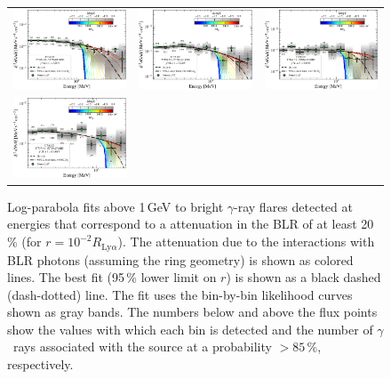 \documentclass[twocolumn]{aastex62}
\newcommand{\Grays}{$\gamma$~rays\xspace}
\newcommand{\gray}{$\gamma$-ray\xspace}
\begin{document}
\begin{figure}
\begin{tabular}{ccc}
    \includegraphics[width=0.32\linewidth]{figures/sed_CTA102_t002_LogParabola_3min_ring_emin1000.pdf} & 
    \includegraphics[width=0.32\linewidth]{figures/sed_CTA102_t003_LogParabola_3min_ring_emin1000.pdf} & 
    \includegraphics[width=0.32\linewidth]{figures/sed_CTA102_t004_LogParabola_3min_ring_emin1000.pdf}\\
    \includegraphics[width=0.32\linewidth]{figures/sed_CTA102_t001_LogParabola_3min_ring_emin1000.pdf}
    \end{tabular}

    \caption{Log-parabola fits above 1\,GeV to bright \gray flares detected at energies that correspond to a attenuation in the BLR of at least 20\,\% (for $r = 10^{-2}R_{\mathrm{Ly}\alpha}$). The attenuation due to the interactions with BLR photons (assuming the ring geometry) is shown as colored lines. The best fit (95\,\% lower limit on $r$) is shown as a black dashed (dash-dotted) line. 
    The fit uses the bin-by-bin likelihood curves shown as gray bands. The numbers below and above the flux points show the  values  with which each bin is detected and the number of \Grays associated with the source at a probability $>85\,\%$, respectively.}
    \label{fig:seds}
\end{figure}
\end{document}
